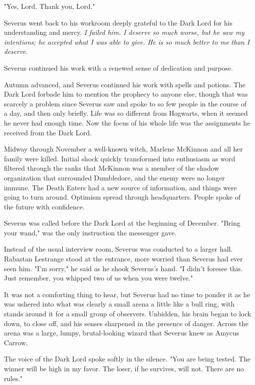 \documentclass[a4paper,11pt]{article}
\begin{document}
"Yes, Lord. Thank you, Lord."

Severus went back to his workroom deeply grateful to the Dark Lord for his understanding and mercy. \emph{I failed him. I deserve so much worse, but he saw my intentions; he accepted what I was able to give. He is so much better to me than I deserve.}

Severus continued his work with a renewed sense of dedication and purpose.

Autumn advanced, and Severus continued his work with spells and potions. The Dark Lord forbade him to mention the prophecy to anyone else, though that was scarcely a problem since Severus saw and spoke to so few people in the course of a day, and then only briefly. Life was so different from Hogwarts, when it seemed he never had enough time. Now the focus of his whole life was the assignments he received from the Dark Lord.

Midway through November a well-known witch, Marlene McKinnon and all her family were killed. Initial shock quickly transformed into enthusiasm as word filtered through the ranks that McKinnon was a member of the shadow organization that surrounded Dumbledore, and the enemy were no longer immune. The Death Eaters had a new source of information, and things were going to turn around. Optimism spread through headquarters. People spoke of the future with confidence.

Severus was called before the Dark Lord at the beginning of December. "Bring your wand," was the only instruction the messenger gave.

Instead of the usual interview room, Severus was conducted to a larger hall. Rabastan Lestrange stood at the entrance, more worried than Severus had ever seen him. "I'm sorry," he said as he shook Severus's hand. "I didn't foresee this. Just remember, you whipped two of us when you were twelve."

It was not a comforting thing to hear, but Severus had no time to ponder it as he was ushered into what was clearly a small arena a little like a bull ring, with stands around it for a small group of observers. Unbidden, his brain began to lock down, to close off, and his senses sharpened in the presence of danger. Across the arena was a large, lumpy, brutal-looking wizard that Severus knew as Amycus Carrow.

The voice of the Dark Lord spoke softly in the silence. "You are being tested. The winner will be high in my favor. The loser, if he survives, will not. There are no rules."
\end{document}
